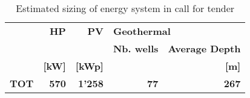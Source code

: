 \begin{table}[h!]
\centering
\caption{Estimated sizing of energy system in call for tender}\vspace{2mm}
\label{tab:ppa_prestudy_tot} 
\begin{tabular}{lrrrr}
\toprule
\textbf{} & \textbf{HP}    & \textbf{PV}    & \multicolumn{2}{l}{\textbf{Geothermal}} \\
         &       &       & \textbf{Nb. wells}        & \textbf{Average Depth}        \\
         & \textbf{[kW]} & \textbf{[kWp] } &                 & \textbf{[m] }         \\ \midrule
\textbf{TOT}      & \textbf{570}   & \textbf{1'258} & \textbf{77}              &    \textbf{267}         \\
\bottomrule
\end{tabular}
\end{table}